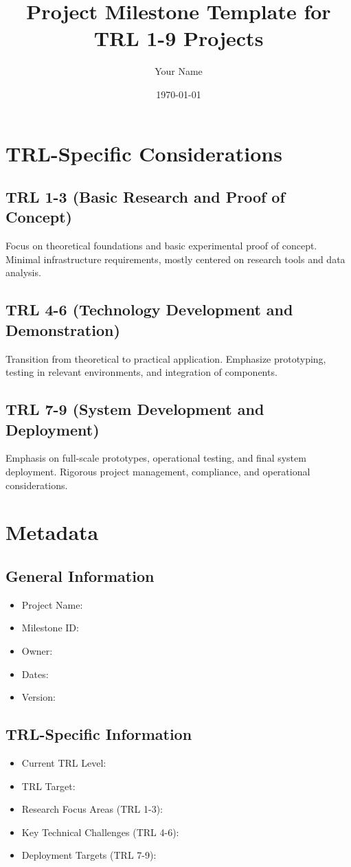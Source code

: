 \documentclass{article}
\title{Project Milestone Template for TRL 1-9 Projects}
\author{Your Name}
\date{\today}
\begin{document}
\maketitle

\section{TRL-Specific Considerations}

\subsection{TRL 1-3 (Basic Research and Proof of Concept)}
Focus on theoretical foundations and basic experimental proof of concept. Minimal infrastructure requirements, mostly centered on research tools and data analysis.

\subsection{TRL 4-6 (Technology Development and Demonstration)}
Transition from theoretical to practical application. Emphasize prototyping, testing in relevant environments, and integration of components.

\subsection{TRL 7-9 (System Development and Deployment)}
Emphasis on full-scale prototypes, operational testing, and final system deployment. Rigorous project management, compliance, and operational considerations.

\section{Metadata}

\subsection{General Information}
\begin{itemize}
    \item Project Name: 
    \item Milestone ID: 
    \item Owner: 
    \item Dates: 
    \item Version: 
\end{itemize}

\subsection{TRL-Specific Information}
\begin{itemize}
    \item Current TRL Level: 
    \item TRL Target: 
    \item Research Focus Areas (TRL 1-3): 
    \item Key Technical Challenges (TRL 4-6): 
    \item Deployment Targets (TRL 7-9): 
\end{itemize}
\end{document}
